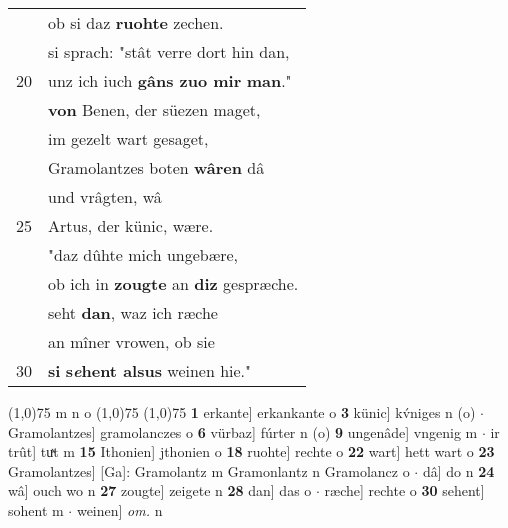 \documentclass[8pt,a4paper,notitlepage]{article}
\begin{document}
\begin{table}[ht]
\begin{minipage}[t]{0.5\linewidth}
\begin{tabular}{rl}
 & ob si daz \textbf{ruohte} zechen.\\ 
 & si sprach: "stât verre dort hin dan,\\ 
20 & unz ich iuch \textbf{gâns zuo mir} \textbf{man}."\\ 
 & \textbf{von} Benen, der süezen maget,\\ 
 & im gezelt wart gesaget,\\ 
 & Gramolantzes boten \textbf{wâren} dâ\\ 
 & und vrâgten, wâ\\ 
25 & Artus, der künic, wære.\\ 
 & "daz dûhte mich ungebære,\\ 
 & ob ich in \textbf{zougte} an \textbf{diz} gespræche.\\ 
 & seht \textbf{dan}, waz ich ræche\\ 
 & an mîner vrowen, ob sie\\ 
30 & \textbf{si} \textbf{s\textit{e}hent alsus} weinen hie."\\ 
\end{tabular}
\scriptsize
\line(1,0){75} \newline
m n o \newline
\line(1,0){75} \newline
\newline
\line(1,0){75} \newline
\textbf{1} erkante] erkankante o \textbf{3} künic] kv́niges n (o)  $\cdot$ Gramolantzes] gramolanczes o \textbf{6} vürbaz] fúrter n (o) \textbf{9} ungenâde] vngenig m  $\cdot$ ir trût] tuͯt m \textbf{15} Ithonien] jthonien o \textbf{18} ruohte] rechte o \textbf{22} wart] hett wart o \textbf{23} Gramolantzes] [Ga]: Gramolantz m Gramonlantz n Gramolancz o  $\cdot$ dâ] do n \textbf{24} wâ] ouch wo n \textbf{27} zougte] zeigete n \textbf{28} dan] das o  $\cdot$ ræche] rechte o \textbf{30} sehent] sohent m  $\cdot$ weinen] \textit{om.} n \newline
\end{minipage}
\end{table}
\newpage
\end{document}
